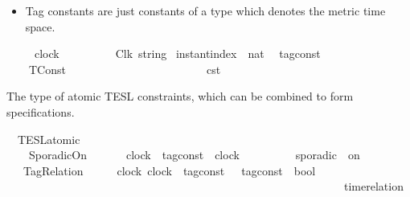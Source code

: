 \begin{isabellebody}
\begin{isamarkuptext}
\begin{itemize}
\item Tag constants are just constants of a type which denotes the metric time space.%
\end{itemize}%
\end{isamarkuptext}\isamarkuptrue%
\isamarkupfalse%
\ \ \ \ \ clock\ \ \ \ \ \ \ \ \ {\isacharequal}\ Clk\ {\isacartoucheopen}string{\isacartoucheclose}\isanewline
{}\isamarkupfalse%
\ instant{\isacharunderscore}index\ {\isacharequal}\ {\isacartoucheopen}nat{\isacartoucheclose}\isanewline
\isanewline
{}\isamarkupfalse%
\ {\isacharprime}{\isasymtau}\ tag{\isacharunderscore}const\ {\isacharequal}\isanewline
\ \ \ \ TConst\ \ \ {\isacharprime}{\isasymtau}\ \ \ \ \ \ \ \ \ \ \ \ \ \ \ \ \ \ \ \ \ \ {\isacharparenleft}{\isachardoublequoteopen}{\isasymtau}\isactrlsub c\isactrlsub s\isactrlsub t{\isachardoublequoteclose}{\isacharparenright}%
\isadelimdocument
%
\endisadelimdocument
%
\isatagdocument
%
\isamarkuptrue%
%
\endisatagdocument
{\isafolddocument}%
%
\isadelimdocument
%
\endisadelimdocument
%
\begin{isamarkuptext}%
The type of atomic TESL constraints, which can be combined to form specifications.%
\end{isamarkuptext}\isamarkuptrue%
\isamarkupfalse%
\ {\isacharprime}{\isasymtau}\ TESL{\isacharunderscore}atomic\ {\isacharequal}\isanewline
\ \ \ \ SporadicOn\ \ \ \ \ \ \ {\isacartoucheopen}clock{\isacartoucheclose}\ {\isacartoucheopen}{\isacharprime}{\isasymtau}\ tag{\isacharunderscore}const{\isacartoucheclose}\ \ {\isacartoucheopen}clock{\isacartoucheclose}\ \ \ \ \ \ \ \ \ {\isacharparenleft}{\isachardoublequoteopen}{\isacharunderscore}\ sporadic\ {\isacharunderscore}\ on\ {\isacharunderscore}{\isachardoublequoteclose}\ {}{}{\isacharparenright}\isanewline
\ \ {\isacharbar}\ TagRelation\ \ \ \ \ \ {\isacartoucheopen}clock{\isacartoucheclose}\ {\isacartoucheopen}clock{\isacartoucheclose}\ {\isacartoucheopen}{\isacharparenleft}{\isacharprime}{\isasymtau}\ tag{\isacharunderscore}const\ {\isasymtimes}\ {\isacharprime}{\isasymtau}\ tag{\isacharunderscore}const{\isacharparenright}\ {\isasymRightarrow}\ bool{\isacartoucheclose}\ \isanewline
\ \ \ \ \ \ \ \ \ \ \ \ \ \ \ \ \ \ \ \ \ \ \ \ \ \ \ \ \ \ \ \ \ \ \ \ \ \ \ \ \ \ \ \ \ \ \ \ \ \ \ \ \ \ \ \ \ \ \ \ {\isacharparenleft}{\isachardoublequoteopen}time{\isacharminus}relation\ {\isasymlfloor}{\isacharunderscore}{\isacharcomma}\ {\isacharunderscore}{\isasymrfloor}\ {\isasymin}\ {\isacharunderscore}{\isachardoublequoteclose}\ {}{}{\isacharparenright}\isanewline

\end{isabellebody}
